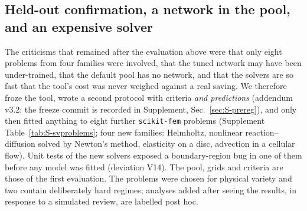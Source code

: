 \subsection{Held-out confirmation, a network in the pool, and an expensive solver}\label{sec:confirm}
The criticisms that remained after the evaluation above were that only eight problems from four families were involved, that the tuned network may have been under-trained, that the default pool has no network, and that the solvers are so fast that the tool's cost was never weighed against a real saving. We therefore froze the tool, wrote a second protocol with criteria \emph{and predictions} (addendum v3.2; the freeze commit is recorded in Supplement, Sec.~\ref{sec:S-prereg}), and only then fitted anything to eight further \texttt{scikit-fem} problems (Supplement Table~\ref{tab:S-svproblems}; four new families: Helmholtz, nonlinear reaction--diffusion solved by Newton's method, elasticity on a disc, advection in a cellular flow). Unit tests of the new solvers exposed a boundary-region bug in one of them before any model was fitted (deviation V14). The pool, grids and criteria are those of the first evaluation. The problems were chosen for physical variety and two contain deliberately hard regimes; analyses added after seeing the results, in response to a simulated review, are labelled post hoc.
